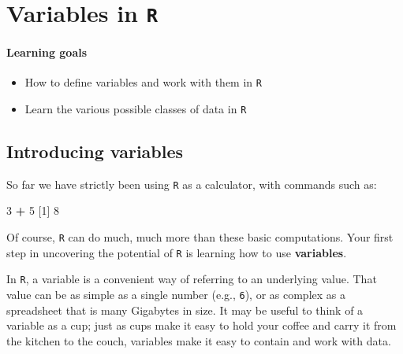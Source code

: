 \documentclass[
]{book}
\newenvironment{Shaded}{\begin{snugshade}}{\end{snugshade}}
\newcommand{\DecValTok}[1]{\textcolor[rgb]{0.00,0.00,0.81}{#1}}
\newcommand{\NormalTok}[1]{#1}
\newcommand{\OperatorTok}[1]{\textcolor[rgb]{0.81,0.36,0.00}{\textbf{#1}}}
\newcommand{\StringTok}[1]{\textcolor[rgb]{0.31,0.60,0.02}{#1}}
\providecommand{\tightlist}{%
  \setlength{\itemsep}{0pt}\setlength{\parskip}{0pt}}
\begin{document}
\hypertarget{variables-in-r}{%
\chapter{\texorpdfstring{Variables in \texttt{R}}{Variables in R}}\label{variables-in-r}}

\hypertarget{learning-goals-2}{%
\subsubsection*{Learning goals}\label{learning-goals-2}}

\begin{itemize}
\tightlist
\item
  How to define variables and work with them in \texttt{R}\\
\item
  Learn the various possible classes of data in \texttt{R}
\end{itemize}

\hypertarget{introducing-variables}{%
\section*{Introducing variables}\label{introducing-variables}}

So far we have strictly been using \texttt{R} as a calculator, with commands such as:

\begin{Shaded}
\begin{Highlighting}[]
\DecValTok{3} \OperatorTok{+}\StringTok{ }\DecValTok{5}
\NormalTok{[}\DecValTok{1}\NormalTok{] }\DecValTok{8}
\end{Highlighting}
\end{Shaded}

Of course, \texttt{R} can do much, much more than these basic computations. Your first step in uncovering the potential of \texttt{R} is learning how to use \textbf{variables}.

In \texttt{R}, a variable is a convenient way of referring to an underlying value. That value can be as simple as a single number (e.g., \texttt{6}), or as complex as a spreadsheet that is many Gigabytes in size. It may be useful to think of a variable as a cup; just as cups make it easy to hold your coffee and carry it from the kitchen to the couch, variables make it easy to contain and work with data.
\end{document}
